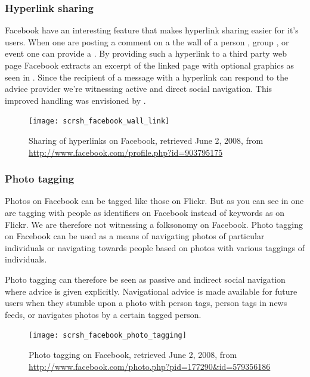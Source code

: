 \subsubsection{Hyperlink sharing}

Facebook have an interesting feature that makes hyperlink sharing easier for
it's users. When one are posting a comment on a the wall of a person
,
group
,
or event
one can provide a . By providing such a hyperlink to a
third party web page Facebook extracts an excerpt of the linked page with
optional graphics as seen in . Since the
recipient of a message with a hyperlink can respond to the advice provider
we're witnessing active and direct social navigation. This
improved  handling was envisioned by
\citet[]{dieberger97}.

\begin{figure}
  \texttt{[image: scrsh\_facebook\_wall\_link]}
  \caption[Facebook Hyperlink Sharing]{%
     Sharing of hyperlinks on Facebook,
     retrieved June 2, 2008, from
     \url{http://www.facebook.com/profile.php?id=903795175}}
  \label{figure:scrsh.facebook.wall.link}
\end{figure}

\subsubsection{Photo tagging}

Photos on Facebook can be tagged  like those on Flickr.
But as you can see in  one are
tagging with people as identifiers on Facebook instead of keywords as on
Flickr. We are
therefore not witnessing a folksonomy on Facebook. Photo tagging on Facebook
can be used as a means of navigating photos of particular individuals or
navigating towards people based on photos with various taggings of
individuals.

Photo tagging can therefore be seen as passive and indirect social navigation
where advice is given explicitly.
Navigational advice is made available for future users when they stumble upon
a photo with person tags, person tags in news feeds, or navigates photos by a
certain tagged person.

\begin{figure}
  \texttt{[image: scrsh\_facebook\_photo\_tagging]}
  \caption[Facebook Photo Tagging]{%
     Photo tagging on Facebook,
     retrieved June 2, 2008, from
     \url{http://www.facebook.com/photo.php?pid=177290&id=579356186}}
  \label{figure:scrsh.facebook.photo.tagging}
\end{figure}

